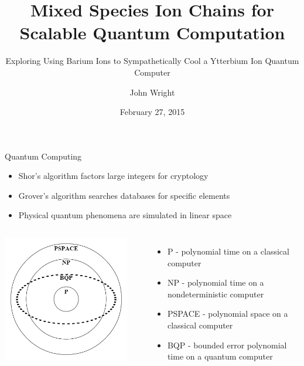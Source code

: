\documentclass{beamer}
\title[Ba-Yb Quantum Computing]{Mixed Species Ion Chains for Scalable Quantum Computation}
\subtitle{Exploring Using Barium Ions to Sympathetically Cool a Ytterbium Ion Quantum Computer}
\author[J. Wright]{John Wright}
\institute[UW] {
	Department of Physics \\
	University of Washington
}
\date[February 2015]{February 27, 2015}
\begin{document}
\begin{frame}[plain]
\titlepage
\end{frame}

\begin{frame}{Quantum Computing}
\begin{itemize}
	\item Shor's algorithm factors large integers for cryptology
	\item Grover's algorithm searches databases for specific elements
	\item Physical quantum phenomena are simulated in linear space
\end{itemize}
\vfill
\begin{columns}[c]
	\includegraphics[width=0.9\textwidth]{BQP_complexity_class_diagram}
	\begin{itemize}
		\item P - polynomial time on a classical computer
		\item NP - polynomial time on a nondeterministic computer
		\item PSPACE - polynomial space on a classical computer
		\item BQP - bounded error polynomial time on a quantum computer
	\end{itemize}
\end{columns}
\end{frame}
\end{document}
